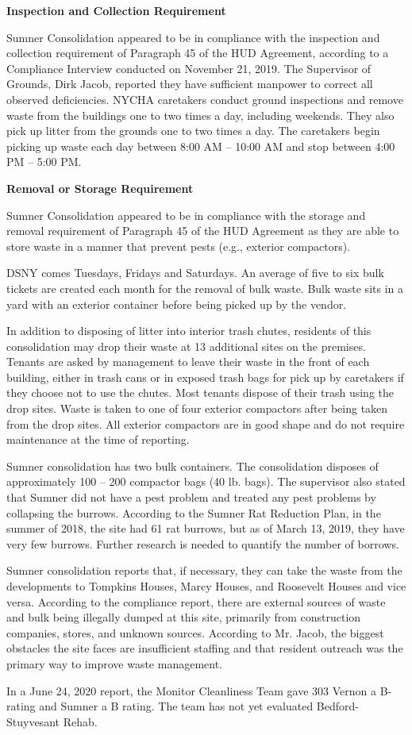 

\textbf{Inspection and Collection Requirement}

Sumner Consolidation appeared to be in compliance with the inspection and collection requirement of  Paragraph 45 of the HUD Agreement, according to a Compliance Interview conducted on November 21, 2019. The Supervisor of Grounds, Dirk Jacob, reported they have sufficient manpower to correct all observed deficiencies. NYCHA caretakers conduct ground inspections and remove waste from the buildings one to two times a day, including weekends. They also pick up litter from the grounds one to two times a day. The caretakers begin picking up waste each day between 8:00 AM -- 10:00 AM and stop between 4:00 PM -- 5:00 PM. 

\textbf{Removal or Storage Requirement}

Sumner Consolidation appeared to be in compliance with the storage and removal requirement of Paragraph 45 of the HUD Agreement as they are able to store waste in a manner that prevent pests (e.g., exterior compactors).

 

DSNY comes Tuesdays, Fridays and Saturdays. An average of five to six bulk tickets are created each month for the removal of bulk waste. Bulk waste sits in a yard with an exterior container before being picked up by the vendor.

In addition to disposing of litter into interior trash chutes, residents of this consolidation may drop their waste at 13 additional sites on the premises. Tenants are asked by management to leave their waste in the front of each building, either in trash cans or in exposed trash bags for pick up by caretakers if they choose not to use the chutes. Most tenants dispose of their trash using the drop sites. Waste is taken to one of four exterior compactors after being taken from the drop sites. All exterior compactors are in good shape and do not require maintenance at the time of reporting.

Sumner consolidation has two bulk containers. The consolidation disposes of approximately 100 -- 200 compactor bags (40 lb. bags). The supervisor also stated that Sumner did not have a pest problem and treated any pest problems by collapsing the burrows. According to the Sumner Rat Reduction Plan, in the summer of 2018, the site had 61 rat burrows, but as of March 13, 2019, they have very few burrows. Further research is needed to quantify the number of borrows.

Sumner consolidation reports that, if necessary, they can take the waste from the developments to Tompkins Houses, Marcy Houses, and Roosevelt Houses and vice versa. According to the compliance report, there are external sources of waste and bulk being illegally dumped at this site, primarily from construction companies, stores, and unknown sources. According to Mr. Jacob, the biggest obstacles the site faces are insufficient staffing and that resident outreach was the primary way to improve waste management. 

In a June 24, 2020 report, the Monitor Cleanliness Team gave 303 Vernon a B- rating and Sumner a B rating. The team has not yet evaluated Bedford-Stuyvesant Rehab.  